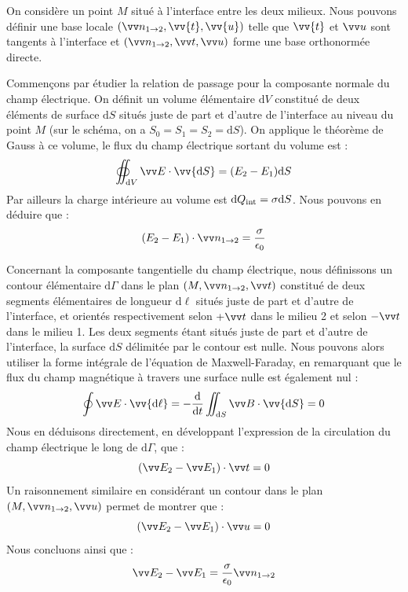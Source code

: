 \documentclass[11pt,fleqn]{book} %
\newcommand{\dd}{\mathrm{d}}
\begin{document}
\begin{demonstration}
	On considère un point $M$ situé à l'interface entre les deux milieux. Nous pouvons définir une base locale $(\vv n_{1 \to 2},\vv{t},\vv{u})$ telle que $\vv{t}$ et $\vv u$ sont tangents à l'interface et $(\vv n_{1 \to 2}, \vv t, \vv u)$ forme une base orthonormée directe.	

	Commençons par étudier la relation de passage pour la composante normale du champ électrique. On définit un volume élémentaire $\dd V$ constitué de deux éléments de surface $\dd S$ situés juste de part et d'autre de l'interface au niveau du point $M$ (sur le schéma, on a $S_0 = S_1 = S_2 = \dd S$). On applique le théorème de Gauss à ce volume, le flux du champ électrique sortant du volume est :
	\begin{equation}
		\oiint_{\dd V} \vv E \cdot \vv{\dd S} = (E_2 - E_1) \dd S 
	\end{equation}
	Par ailleurs la charge intérieure au volume est $\dd Q_{\rm int} = \sigma \dd S$. Nous pouvons en déduire que :
	\begin{equation}
		(E_2 - E_1)\cdot \vv n_{1 \to 2}  = \frac{\sigma}{\epsilon_0}
	\end{equation}

	Concernant la composante tangentielle du champ électrique, nous définissons un contour élémentaire $\dd \Gamma$ dans le plan $(M,\vv n_{1 \to 2}, \vv t)$ constitué de deux segments élémentaires de longueur $\dd \ell$ situés juste de part et d'autre de l'interface, et orientés respectivement selon $+\vv t$ dans le milieu 2 et selon $-\vv t$ dans le milieu 1. Les deux segments étant situés juste de part et d'autre de l'interface, la surface $\dd S$ délimitée par le contour est nulle. Nous pouvons alors utiliser la forme intégrale de l'équation de Maxwell-Faraday, en remarquant que le flux du champ magnétique à travers une surface nulle est également nul :
	\begin{equation}
		\oint \vv E \cdot \vv{\dd \ell} = - \frac{\dd}{\dd t} \iint_{\dd S} \vv B \cdot \vv{\dd S} = 0
	\end{equation}
	Nous en déduisons directement, en développant l'expression de la circulation du champ électrique le long de $\dd \Gamma$, que :
	\begin{equation}
		(\vv E_2 - \vv E_1) \cdot \vv t = 0
	\end{equation}
	Un raisonnement similaire en considérant un contour dans le plan $(M, \vv n_{1 \to 2}, \vv u)$ permet de montrer que :
	\begin{equation}
		(\vv E_2 - \vv E_1) \cdot \vv u = 0
	\end{equation}
	Nous concluons ainsi que :
	\begin{equation}
		\vv E_2 - \vv E_1 = \frac{\sigma}{\epsilon_0} \vv n_{1 \to 2}
	\end{equation}


\end{demonstration}
\end{document}
